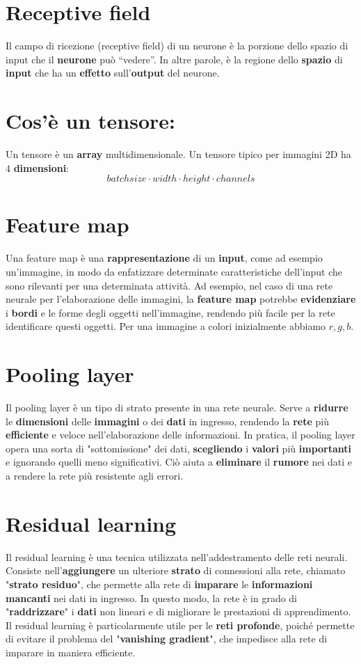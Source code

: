\documentclass{article}
\begin{document}
\section{Receptive field}   
Il campo di ricezione (receptive field) di un neurone è la porzione dello spazio di input che il \textbf{neurone} può ``vedere''. In altre parole, è la regione dello \textbf{spazio} di \textbf{input} che ha un \textbf{effetto} sull'\textbf{output} del neurone.

\section{Cos'è un tensore:}
Un tensore è un \textbf{array} multidimensionale. Un tensore tipico per immagini 2D  ha $4$ \textbf{dimensioni}:
$$batchsize \cdot width \cdot height \cdot channels$$

\section{Feature map}
Una feature map è una \textbf{rappresentazione} di un \textbf{input}, come ad esempio un'immagine, in modo da enfatizzare determinate caratteristiche dell'input che sono rilevanti per una determinata attività. Ad esempio, nel caso di una rete neurale per l'elaborazione delle immagini, la \textbf{feature map} potrebbe \textbf{evidenziare} i \textbf{bordi} e le forme degli oggetti nell'immagine, rendendo più facile per la rete identificare questi oggetti.
Per una immagine a colori inizialmente abbiamo $r,g,b$.

\section{Pooling layer}
Il pooling layer è un tipo di strato presente in una rete neurale. Serve a \textbf{ridurre} le \textbf{dimensioni} delle \textbf{immagini} o dei \textbf{dati} in ingresso, rendendo la \textbf{rete} più \textbf{efficiente} e veloce nell'elaborazione delle informazioni. In pratica, il pooling layer opera una sorta di "sottomissione" dei dati, \textbf{scegliendo} i \textbf{valori} più \textbf{importanti} e ignorando quelli meno significativi. Ciò aiuta a \textbf{eliminare} il \textbf{rumore} nei dati e a rendere la rete più resistente agli errori.

\section{Residual learning}
Il residual learning è una tecnica utilizzata nell'addestramento delle reti neurali. Consiste nell'\textbf{aggiungere} un ulteriore \textbf{strato} di connessioni alla rete, chiamato "\textbf{strato residuo}", che permette alla rete di \textbf{imparare} le \textbf{informazioni} \textbf{mancanti} nei dati in ingresso. In questo modo, la rete è in grado di "\textbf{raddrizzare}" i \textbf{dati} non lineari e di migliorare le prestazioni di apprendimento. Il residual learning è particolarmente utile per le \textbf{reti profonde}, poiché permette di evitare il problema del "\textbf{vanishing gradient}", che impedisce alla rete di imparare in maniera efficiente.
\end{document}
